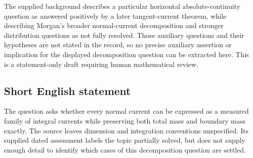 \documentclass[11pt]{article}
\begin{document}
The supplied background describes a particular horizontal absolute-continuity question as answered positively by a later tangent-current theorem, while describing Morgan's broader normal-current decomposition and stronger distribution questions as not fully resolved. Those auxiliary questions and their hypotheses are not stated in the record, so no precise auxiliary assertion or implication for the displayed decomposition question can be extracted here. This is a statement-only draft requiring human mathematical review.
\subsection{Short English statement}
The question asks whether every normal current can be expressed as a measured family of integral currents while preserving both total mass and boundary mass exactly. The source leaves dimension and integration conventions unspecified. Its supplied dated assessment labels the topic partially solved, but does not supply enough detail to identify which cases of this decomposition question are settled.
\end{document}
